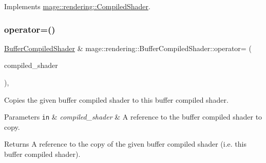 Implements \mbox{\hyperlink{classmage_1_1rendering_1_1_compiled_shader_a92c17b46242bf884c3d0d673e88a292d}{mage\+::rendering\+::\+Compiled\+Shader}}.

\mbox{\label{classmage_1_1rendering_1_1_buffer_compiled_shader_a1f8eb13198c5bad8ebe55ae1ddf94769}} 
\subsubsection{\texorpdfstring{operator=()}{operator=()}\hspace{0.1cm}{\footnotesize\ttfamily [1/2]}}
{\footnotesize\ttfamily \mbox{\hyperlink{classmage_1_1rendering_1_1_buffer_compiled_shader}{Buffer\+Compiled\+Shader}} \& mage\+::rendering\+::\+Buffer\+Compiled\+Shader\+::operator= (\begin{DoxyParamCaption}\item[{const \mbox{\hyperlink{classmage_1_1rendering_1_1_buffer_compiled_shader}{Buffer\+Compiled\+Shader}} \&}]{compiled\+\_\+shader }\end{DoxyParamCaption})\hspace{0.3cm}{\ttfamily [default]}, {\ttfamily [noexcept]}}

Copies the given buffer compiled shader to this buffer compiled shader.


\begin{DoxyParams}[1]{Parameters}
\mbox{\tt in}  & {\em compiled\+\_\+shader} & A reference to the buffer compiled shader to copy. \\
\hline
\end{DoxyParams}
\begin{DoxyReturn}{Returns}
A reference to the copy of the given buffer compiled shader (i.\+e. this buffer compiled shader). 
\end{DoxyReturn}
\mbox{\label{classmage_1_1rendering_1_1_buffer_compiled_shader_a0e11565292a427dff5b36ef7c26b6d08}} 

